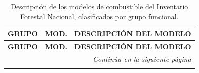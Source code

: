 \footnotesize
\begin{longtable}{|p{2.5cm}|c|p{9cm}|}
    \caption{Descripción de los modelos de combustible del Inventario Forestal Nacional, clasificados por grupo funcional.}
    \label{tab:modelos_combustible}                                                                                                                                                                                                                    \\
    \hline
    \rowcolor[HTML]{D9EAD3} \textbf{GRUPO}   & \textbf{MOD.} & \textbf{DESCRIPCIÓN DEL MODELO}                                                                                                                                                         \\
    \hline
    \endfirsthead
    \hline
    \rowcolor[HTML]{D9EAD3} \textbf{GRUPO}   & \textbf{MOD.} & \textbf{DESCRIPCIÓN DEL MODELO}                                                                                                                                                         \\
    \hline
    \endhead
    \hline
    \multicolumn{3}{r}{\emph{Continúa en la siguiente página}}                                                                                                                                                                                         \\
    \endfoot
    \hline
    \endlastfoot


\end{longtable}

